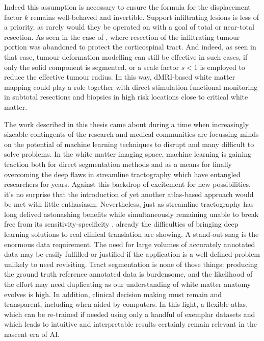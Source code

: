 Indeed this assumption is necessary to ensure the formula for the displacement factor $k$ remains well-behaved and invertible.
Support infiltrating lesions is less of a priority, as rarely  would they be operated on with a goal of total or near-total resection.
As seen in the case of , where resection of the infiltrating tumour portion was abandoned to protect the corticospinal tract.
And indeed, as seen in that case, tumour deformation modelling can still be effective in such cases, if only the solid component is segmented, or a scale factor $s<1$ is employed to reduce the effective tumour radius.
In this way, dMRI-based white matter mapping could play a role together with direct stimulation functional monitoring in subtotal resections and biopsies in high risk locations close to critical white matter.

The work described in this thesis came about during a time when increasingly sizeable contingents of the research and medical communities are focussing minds on the potential of machine learning techniques to disrupt and  many difficult to solve problems.
In the white matter imaging space, machine learning is gaining traction both for direct segmentation methods and as a means for finally overcoming the deep flaws in streamline tractography which have entangled researchers for years.
Against this backdrop of excitement for new possibilities, it's no surprise that the introduction of yet another atlas-based approach would be met with little enthusiasm.
Nevertheless, just as streamline tractography has long delived astonashing benefits while simultaneously remaining unable to break free from its sensitivity-specificity , already the difficulties of bringing deep learning solutions to real clinical translation are showing.
A stand-out snag is the enormous data requirement.
The need for large volumes of accurately annotated data may be easily fulfilled  or justified if the application is a well-defined problem unlikely to need revisiting.
Tract segmentation is none of those things: producing the ground truth reference annotated data is burdensome, and the likelihood of the effort may need duplicating as our understanding of white matter anatomy evolves is high.
In addition, clinical decision making must remain  and transparent, including when aided by computers.
In this light, a flexible atlas, which can be re-trained if needed using only a handful of exemplar datasets and which leads to intuitive and interpretable results  certainly remain relevant in the nascent era of AI.

